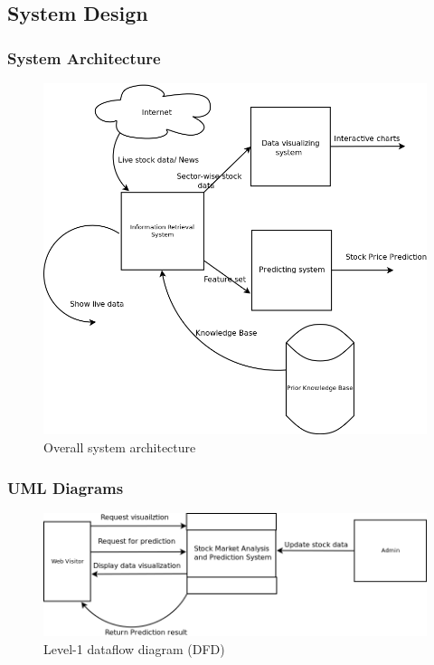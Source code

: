 \subsection{System Design}
\subsubsection{System Architecture}
\begin{figure}[H]\centering
  \includegraphics[width=5in]{fig/System}
  \caption{Overall system architecture}
  \label{fig:System}
\end{figure}

\subsubsection{UML Diagrams}
\begin{figure}[H]\centering
  \includegraphics[width=6in]{fig/Dfd1}
  \caption{Level-1 dataflow diagram (DFD)}
  \label{fig:Dfd1}
\end{figure}


